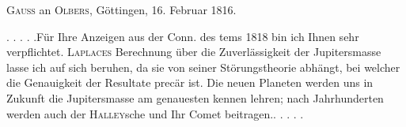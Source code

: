 \par{}\bigskip
\begin{center}
\textsc{Gauss} an \textsc{Olbers}, Göttingen, 16. Februar 1816.
\end{center}
\noindent\hspace*{\parindent}. . . . .\quad Für Ihre Anzeigen aus der Conn. des tems 1818 bin ich Ihnen sehr verpflichtet. \textsc{Laplaces} Berechnung über die Zuverlässigkeit der Jupitersmasse lasse ich auf sich beruhen, da sie von seiner Störungstheorie abhängt, bei welcher die Genauigkeit der Resultate precär ist. Die neuen Planeten werden uns in Zukunft die Jupitersmasse am genauesten kennen lehren; nach Jahrhunderten werden auch der \textsc{Halley}sche und Ihr Comet beitragen.\quad . . . . .
\par
